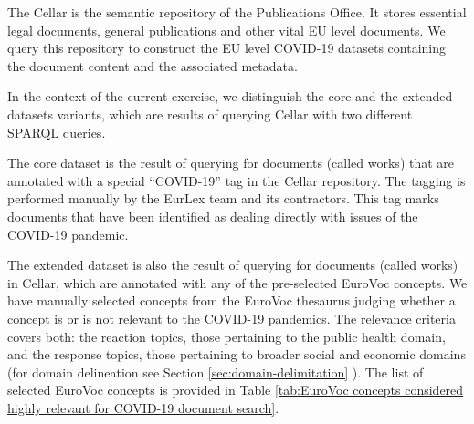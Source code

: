The Cellar is the semantic repository of the Publications Office. It stores essential legal documents, general publications and other vital EU level documents. We query this repository to construct the EU level COVID-19 datasets containing the document content and the associated metadata. 

In the context of the current exercise, we distinguish the core and the extended datasets variants, which are results of querying Cellar with two different SPARQL queries.

The core dataset is the result of querying for documents (called works) that are annotated with a special ``COVID-19''  tag in the Cellar repository. The tagging is performed manually by the EurLex team and its contractors. This tag marks documents that have been identified as dealing directly with issues of the COVID-19 pandemic. 

The extended dataset is also the result of querying for documents (called works) in Cellar, which are annotated with any of the pre-selected EuroVoc concepts. We have manually selected concepts from the EuroVoc thesaurus judging whether a concept is or is not relevant to the COVID-19 pandemics. The relevance criteria covers both: the reaction topics, those pertaining to the public health domain, and the response topics, those pertaining to broader social and economic domains (for domain delineation see Section \ref{sec:domain-delimitation} ). The list of selected EuroVoc concepts is provided in  Table \ref{tab:EuroVoc concepts considered highly relevant for COVID-19 document search}. 

